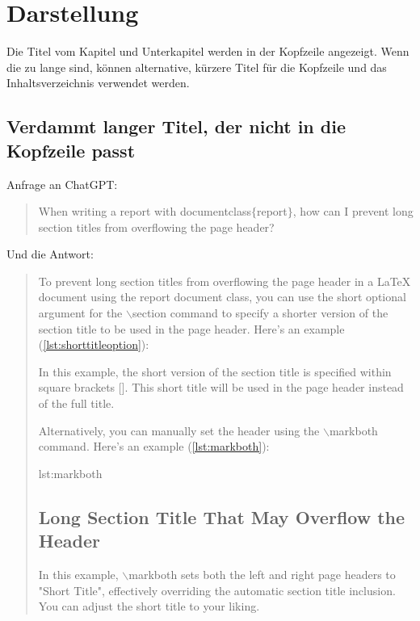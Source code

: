 \chapter{Darstellung}
Die Titel vom Kapitel und Unterkapitel werden
in der Kopfzeile angezeigt. Wenn die zu lange sind, können alternative, kürzere Titel für die Kopfzeile und das Inhaltsverzeichnis verwendet werden.
\section[Gekürzter Titel]{Verdammt langer Titel, der nicht in die Kopfzeile passt}

Anfrage an ChatGPT:
	\begin{quote}
When writing a report with documentclass$\{$report$\}$, how can I prevent long section titles from overflowing the page header?
	\end{quote}
\noindent
Und die Antwort:
	\begin{quote}
To prevent long section titles from overflowing the page header in a LaTeX
		document using the report document class, you can use the short optional
		argument for the $\backslash$section command to specify a shorter version of the section title to be used in the page header. Here's an example (\autoref{lst:shorttitleoption}):

In this example, the short version of the section title is specified within square brackets []. This short title will be used in the page header instead of the full title.

\newpage
Alternatively, you can manually set the header using the $\backslash$markboth command. Here's an example (\autoref{lst:markboth}):
\begin{latexcode}{lst:markboth}
\section{Long Section Title That May Overflow the Header}
\end{latexcode}

In this example, $\backslash$markboth sets both the left and right page headers to "Short Title", effectively overriding the automatic section title inclusion. You can adjust the short title to your liking.

	\end{quote}